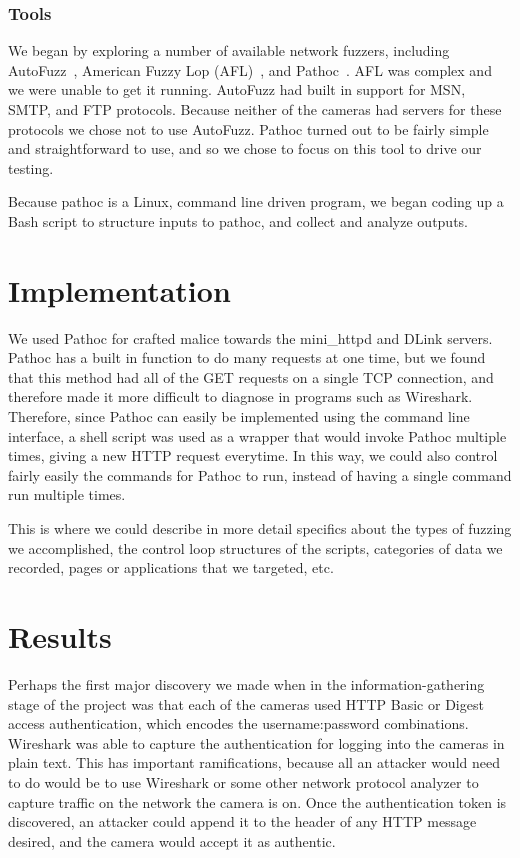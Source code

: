 \documentclass[letterpaper,twocolumn,10pt]{article}
\begin{document}
 

\subsubsection{Tools}
We began by exploring a number of available network fuzzers, including AutoFuzz~\cite{autofuzz}, American Fuzzy Lop (AFL)~\cite{afl}, and Pathoc~\cite{pathod}. AFL was complex and we were unable to get it running. AutoFuzz had built in support for MSN, SMTP, and FTP protocols. Because neither of the cameras had servers for these protocols we chose not to use AutoFuzz. Pathoc turned out to be fairly simple and straightforward to use, and so we chose to focus on this tool to drive our testing. 

Because pathoc is a Linux, command line driven program, we began coding up a Bash script to structure inputs to pathoc, and collect and analyze outputs. 


\section{Implementation}

We used Pathoc for crafted malice towards the mini\_httpd and DLink servers. Pathoc has a built in function to do many requests at one time, but we found that this method had all of the GET requests on a single TCP connection, and therefore made it more difficult to diagnose in programs such as Wireshark. Therefore, since Pathoc can easily be implemented using the command line interface, a shell script was used as a wrapper that would invoke Pathoc multiple times, giving a new HTTP request everytime. In this way, we could also control fairly easily the commands for Pathoc to run, instead of having a single command run multiple times.

This is where we could describe in more detail specifics about the types of fuzzing we accomplished, the control loop structures of the scripts, categories of data we recorded, pages or applications that we targeted, etc.




\section{Results}


Perhaps the first major discovery we made when in the information-gathering stage of the project was that each of the cameras used HTTP Basic or Digest access authentication, which encodes the username:password combinations. Wireshark was able to capture the authentication for logging into the cameras in plain text. This has important ramifications, because all an attacker would need to do would be to use Wireshark or some other network protocol analyzer to capture traffic on the network the camera is on. Once the authentication token is discovered, an attacker could append it to the header of any HTTP message desired, and the camera would accept it as authentic. 





{\footnotesize 
}
\end{document}
